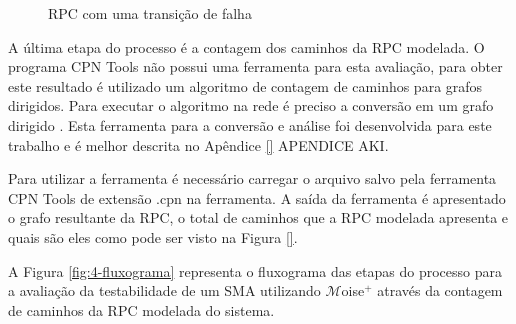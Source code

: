 \begin{figure}[ht]
  \centering
  \caption{RPC com uma transição de falha}
  \label{fig:RPC-3}
\end{figure}

A última etapa do processo é a contagem dos caminhos da RPC modelada. O programa CPN Tools não possui uma ferramenta para esta avaliação, para obter este resultado é utilizado um algoritmo de contagem de caminhos para grafos dirigidos. Para executar o algoritmo na rede é preciso a conversão em um grafo dirigido . Esta ferramenta para a conversão e análise foi desenvolvida para este trabalho e é melhor descrita no Apêndice \ref{} APENDICE AKI. 

Para utilizar a ferramenta é necessário carregar o arquivo salvo pela ferramenta CPN Tools de extensão .cpn na ferramenta. A saída da ferramenta é apresentado o grafo resultante da RPC, o total de caminhos que a RPC modelada apresenta e quais são eles como pode ser visto na Figura \ref{}.



A Figura \ref{fig:4-fluxograma} representa o fluxograma das etapas do processo para a avaliação da testabilidade de um SMA utilizando $\mathcal{M}$oise$^{+}$ através da contagem de caminhos da RPC modelada do sistema.


